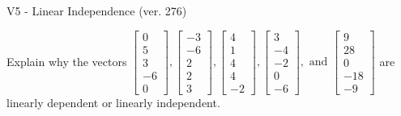 \begin{exercise}
  \begin{exerciseTitle}V5 - Linear Independence (ver. 276)\end{exerciseTitle}
  \begin{exerciseStatement}
    Explain why the vectors \(\left[\begin{array}{r}
0 \\
5 \\
3 \\
-6 \\
0
\end{array}\right] , \left[\begin{array}{r}
-3 \\
-6 \\
2 \\
2 \\
3
\end{array}\right] , \left[\begin{array}{r}
4 \\
1 \\
4 \\
4 \\
-2
\end{array}\right] , \left[\begin{array}{r}
3 \\
-4 \\
-2 \\
0 \\
-6
\end{array}\right] , \text{ and } \left[\begin{array}{r}
9 \\
28 \\
0 \\
-18 \\
-9
\end{array}\right]\) are linearly dependent or linearly independent.	



\end{exerciseStatement}
\end{exercise}
